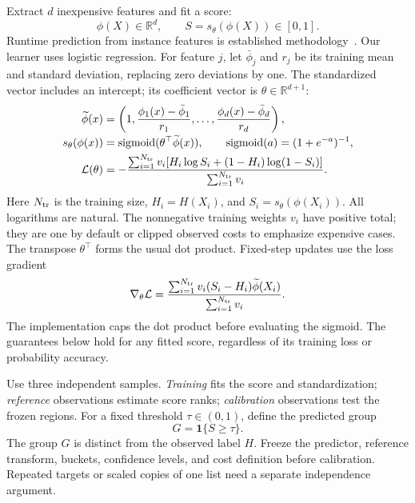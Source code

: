 \documentclass[10pt,letterpaper]{article}
\newcommand{\ind}{\mathbf1}
\newcommand{\sigmoid}{\operatorname{sigmoid}}
\begin{document}
Extract $d$ inexpensive features and fit a score:
\[
 \phi(X)\in\mathbb R^d,\qquad S=s_\theta(\phi(X))\in[0,1].
\]
Runtime prediction from instance features is established methodology~\cite{hutter}. Our learner uses logistic regression. For feature $j$, let $\bar\phi_j$ and $r_j$ be its training mean and standard deviation, replacing zero deviations by one. The standardized vector includes an intercept; its coefficient vector is $\theta\in\mathbb R^{d+1}$:
\begin{align}
 \widetilde\phi(x)&=\left(1,\frac{\phi_1(x)-\bar\phi_1}{r_1},\ldots,
                              \frac{\phi_d(x)-\bar\phi_d}{r_d}\right),\nonumber\\[-2pt]
 s_\theta(\phi(x))&=\sigmoid(\theta^\top\widetilde\phi(x)),\qquad
 \sigmoid(a)=(1+e^{-a})^{-1},\label{eq:score}\\
 \mathcal L(\theta)&=-\frac{\sum_{i=1}^{N_{\rm tr}} v_i[H_i\log S_i+(1-H_i)\log(1-S_i)]}{\sum_{i=1}^{N_{\rm tr}} v_i}.
 \label{eq:loss}
\end{align}
Here $N_{\rm tr}$ is the training size, $H_i=H(X_i)$, and $S_i=s_\theta(\phi(X_i))$. All logarithms are natural. The nonnegative training weights $v_i$ have positive total; they are one by default or clipped observed costs to emphasize expensive cases. The transpose $\theta^\top$ forms the usual dot product. Fixed-step updates use the loss gradient
\[
 \nabla_\theta\mathcal L
 =\frac{\sum_{i=1}^{N_{\rm tr}}v_i(S_i-H_i)\widetilde\phi(X_i)}
        {\sum_{i=1}^{N_{\rm tr}}v_i}.
\]
The implementation caps the dot product before evaluating the sigmoid. The guarantees below hold for any fitted score, regardless of its training loss or probability accuracy.

Use three independent samples. \emph{Training} fits the score and standardization; \emph{reference} observations estimate score ranks; \emph{calibration} observations test the frozen regions. For a fixed threshold $\tau\in(0,1)$, define the predicted group
\[
 G=\ind\{S\ge\tau\}.
\]
The group $G$ is distinct from the observed label $H$. Freeze the predictor, reference transform, buckets, confidence levels, and cost definition before calibration. Repeated targets or scaled copies of one list need a separate independence argument.
\end{document}
